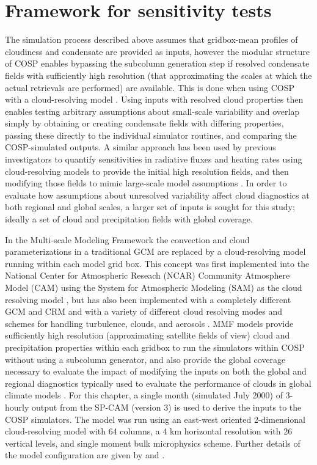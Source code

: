 \section{Framework for sensitivity tests}
\label{section_subgrid_framework}
The simulation process described above assumes that gridbox-mean profiles of cloudiness and condensate are provided as inputs, however the modular structure of COSP enables bypassing the subcolumn generation step if resolved condensate fields with sufficiently high resolution (that approximating the scales at which the actual retrievals are performed) are available. This is done when using COSP with a cloud-resolving model \citep[e.g.,][]{marchand_et_al_2009, marchand_and_ackerman_2010}. Using inputs with resolved cloud properties then enables testing arbitrary assumptions about small-scale variability and overlap simply by obtaining or creating condensate fields with differing properties, passing these directly to the individual simulator routines, and comparing the COSP-simulated outputs. A similar approach has been used by previous investigators to quantify sensitivities in radiative fluxes and heating rates using cloud-resolving models to provide the initial high resolution fields, and then modifying those fields to mimic large-scale model assumptions \citep[e.g.,][]{barker_et_al_1999, wu_and_liang_2005}. In order to evaluate how assumptions about unresolved variability affect cloud diagnostics at both regional and global scales, a larger set of inputs is sought for this study; ideally a set of cloud and precipitation fields with global coverage.

In the Multi-scale Modeling Framework \citep[MMF;][]{randall_et_al_2003} the convection and cloud parameterizations in a traditional GCM are replaced by a cloud-resolving model running within each model grid box. This concept was first implemented into the National Center for Atmospheric Reseach (NCAR) Community Atmosphere Model (CAM) using the System for Atmospheric Modeling (SAM) as the cloud resolving model \citep[SP-CAM;][]{khairoutdinov_and_randall_2001}, but has also been implemented with a completely different GCM and CRM \citep{tao_et_al_2009} and with a variety of different cloud resolving modes and schemes for handling turbulence, clouds, and aerosols \citep[e.g.,][]{cheng_and_xu_2011, cheng_and_xu_2013}. MMF models provide sufficiently high resolution (approximating satellite fields of view) cloud and precipitation properties within each gridbox to run the simulators within COSP without using a subcolumn generator, and also provide the global coverage necessary to evaluate the impact of modifying the inputs on both the global and regional diagnostics typically used to evaluate the performance of clouds in global climate models \citep[e.g.,][]{gleckler_et_al_2008}. For this chapter, a single month (simulated July 2000) of 3-hourly output from the SP-CAM (version 3) is used to derive the inputs to the COSP simulators. The model was run using an east-west oriented 2-dimensional cloud-resolving model with 64 columns, a 4 km horizontal resolution with 26 vertical levels, and single moment bulk microphysics scheme.  Further details of the model configuration are given by \cite{khairoutdinov_et_al_2005} and \cite{marchand_et_al_2009}.

